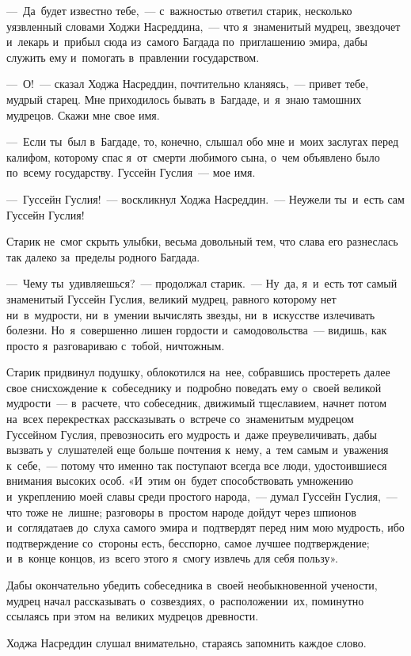 \documentclass[12pt,a4paper]{book}
\begin{document}
—~Да~будет известно тебе,~— с~важностью ответил старик, несколько уязвленный словами Ходжи Насреддина,~— что я~знаменитый мудрец, звездочет и~лекарь и~прибыл сюда из~самого Багдада по~приглашению эмира, дабы служить ему и~помогать в~правлении государством.

—~О!~— сказал Ходжа Насреддин, почтительно кланяясь,~— привет тебе, мудрый старец. Мне приходилось бывать в~Багдаде, и~я~знаю тамошних мудрецов. Скажи мне свое имя.

—~Если ты~был в~Багдаде, то, конечно, слышал обо мне и~моих заслугах перед калифом, которому спас я~от~смерти любимого сына, о~чем объявлено было по~всему государству. Гуссейн Гуслия~— мое имя.

—~Гуссейн Гуслия!~— воскликнул Ходжа Насреддин.~— Неужели ты~и~есть сам Гуссейн Гуслия!

Старик не~смог скрыть улыбки, весьма довольный тем, что слава его разнеслась так далеко за~пределы родного Багдада.

—~Чему ты~удивляешься?~— продолжал старик.~— Ну~да, я~и~есть тот самый знаменитый Гуссейн Гуслия, великий мудрец, равного которому нет ни~в~мудрости, ни~в~умении вычислять звезды, ни~в~искусстве излечивать болезни. Но~я~совершенно лишен гордости и~самодовольства~— видишь, как просто я~разговариваю с~тобой, ничтожным.

Старик придвинул подушку, облокотился на~нее, собравшись простереть далее свое снисхождение к~собеседнику и~подробно поведать ему о~своей великой мудрости~— в~расчете, что собеседник, движимый тщеславием, начнет потом на~всех перекрестках рассказывать о~встрече со~знаменитым мудрецом Гуссейном Гуслия, превозносить его мудрость и~даже преувеличивать, дабы вызвать у~слушателей еще больше почтения к~нему, а~тем самым и~уважения к~себе,~— потому что именно так поступают всегда все люди, удостоившиеся внимания высоких особ. «И~этим он~будет способствовать умножению и~укреплению моей славы среди простого народа,~— думал Гуссейн Гуслия,~— что тоже не~лишне; разговоры в~простом народе дойдут через шпионов и~соглядатаев до~слуха самого эмира и~подтвердят перед ним мою мудрость, ибо подтверждение со~стороны есть, бесспорно, самое лучшее подтверждение; и~в~конце концов, из~всего этого я~смогу извлечь для себя пользу».

Дабы окончательно убедить собеседника в~своей необыкновенной учености, мудрец начал рассказывать о~созвездиях, о~расположении~их, поминутно ссылаясь при этом на~великих мудрецов древности.

Ходжа Насреддин слушал внимательно, стараясь запомнить каждое слово.
\end{document}
